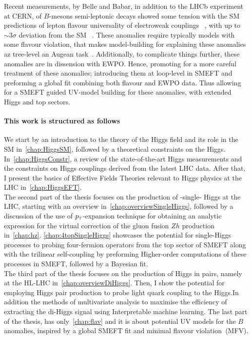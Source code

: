  Recent measurements, by  Belle and Babar, in addition to the LHCb experiment at CERN, of $B$-mesons semi-leptonic decays showed some tension with the SM predictions of lepton flavour universality of electroweak couplings ~\cite{Aaij:2014ora,Aaij:2017vbb,Aaij:2019wad,Abdesselam:2019wac,LHCb:2021trn}, with up to $\sim 3\sigma$ deviation from the SM  ~\cite{Chatrchyan:2013bka,Aaij:2017vad,Aaboud:2018mst,Aaij:2020nol}. These  anomalies require typically models with some flavour violation, that makes model-building for explaining these anomalies az tree-level an Augean task~\cite{DiLuzio:2017vat,Calibbi:2017qbu,Bordone:2017bld,Barbieri:2017tuq,Assad:2017iib,Heeck:2018ntp,Fornal:2018dqn,Crivellin:2018yvo,Crivellin:2019dwb,Bordone:2019uzc}. Additionally, to complicate things further, these anomalies are in dissension with EWPO. Hence, promoting for a more careful treatment of these anomalies; introducing them at loop-level in SMEFT and preforming a global fit combining both flavour and EWPO data. Thus allowing for a SMEFT guided UV-model building for these anomalies, with extended Higgs and top sectors. \\
 
\paragraph{This work is structured as follows\color{Cayenne}{:}}
We start by an introduction to the theory of the Higgs field and its role in the SM in~\autoref{chap:HiggsSM}, followed by a theoretical constraints on the Higgs. In~\autoref{chap:HiggsConstr}, a review of the state-of-the-art Higgs measurements and the constraints on Higgs couplings derived from the latest LHC data. After that, I present the basics of Effective Fields Theories relevant to Higgs physics at the LHC in~\autoref{chap:HiggsEFT}. \\ The second part of the thesis focuses on the production of -single- Higgs at the LHC, starting with an overview in~\autoref{chap:overviewSingleHiggs}, followed by a discussion of the use of $p_{\scriptscriptstyle T}$-expansion technique for obtaining an analytic expression for the virtual correction of the gluon fusion $Zh$ production in~\autoref{chap:hz}. \autoref{chap:4topSingleHiggs} showcases the potential for single-Higgs processes to probing four-fermion operators from the top sector of SMEFT along with the trilinear self-coupling by preforming Higher-order computations of these processes in SMEFT, followed by a Bayesian fit. \\ The third part of the thesis focuses on the production of Higgs in pairs, namely at the HL-LHC in~\autoref{chap:overviewDiHiggs}. Then, I show the potential for employing Higgs pair production to probe light quark coupling to the Higgs.In addition the methods of multivariate analysis to maximise the efficiency of  extracting the di-Higgs signal using Interpretable machine learning.  The last part of the thesis, has only~\autoref{chap:flav} and it is about potential UV models for the $B$ anomalies, inspired by a global SMEFT fit and minimal flavour violation~(MFV). 









